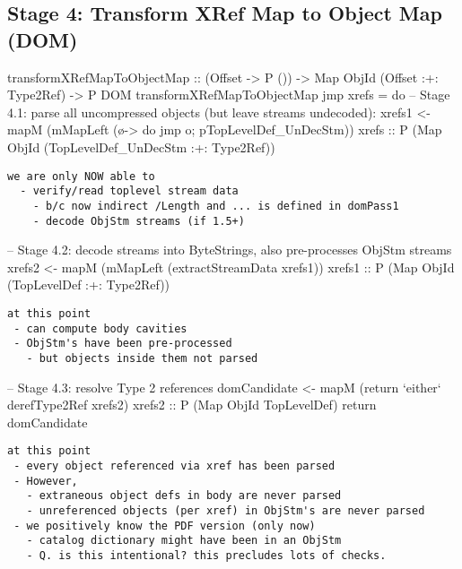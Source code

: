 
\subsection{Stage 4: Transform XRef Map to Object Map (DOM)}

\begin{code}
transformXRefMapToObjectMap
  :: (Offset -> P ()) -> Map ObjId (Offset :+: Type2Ref) -> P DOM
transformXRefMapToObjectMap jmp xrefs =
    do
    -- Stage 4.1: parse all uncompressed objects (but leave streams undecoded):
    xrefs1 <- mapM
                (mMapLeft (\o-> do {jmp o; pTopLevelDef_UnDecStm}))
                xrefs
              :: P (Map ObjId (TopLevelDef_UnDecStm :+: Type2Ref))
\end{code}


\begin{lstlisting}[style=meta]
we are only NOW able to
  - verify/read toplevel stream data
    - b/c now indirect /Length and ... is defined in domPass1
    - decode ObjStm streams (if 1.5+)
\end{lstlisting}

\begin{code}
    -- Stage 4.2: decode streams into ByteStrings, also pre-processes ObjStm streams
    xrefs2 <- mapM
                (mMapLeft (extractStreamData xrefs1))
                xrefs1
              :: P (Map ObjId (TopLevelDef :+: Type2Ref))
\end{code}

\begin{lstlisting}[style=meta]
at this point
 - can compute body cavities
 - ObjStm's have been pre-processed
   - but objects inside them not parsed
\end{lstlisting}

\begin{code}
    -- Stage 4.3: resolve Type 2 references
    domCandidate <- mapM
                     (return `either` derefType2Ref xrefs2)
                     xrefs2
                    :: P (Map ObjId TopLevelDef)
    return domCandidate
\end{code}

\begin{lstlisting}[style=meta]
at this point
 - every object referenced via xref has been parsed
 - However,
   - extraneous object defs in body are never parsed
   - unreferenced objects (per xref) in ObjStm's are never parsed
 - we positively know the PDF version (only now)
   - catalog dictionary might have been in an ObjStm
   - Q. is this intentional? this precludes lots of checks.
\end{lstlisting}

